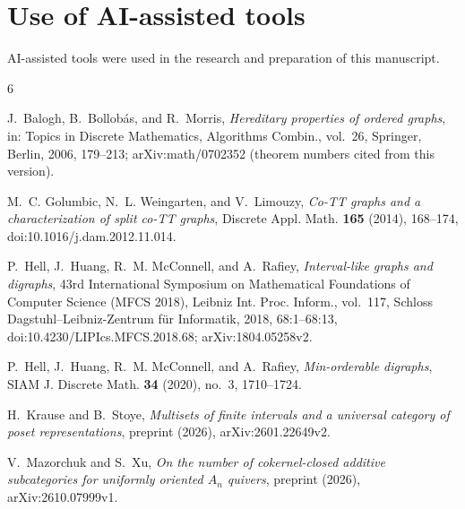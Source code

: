 \documentclass[11pt]{amsart}
\theoremstyle{definition}
\theoremstyle{remark}
\numberwithin{equation}{section}
\begin{document}
\section*{Use of AI-assisted tools}

AI-assisted tools were used in the research and preparation of this manuscript.

\begin{thebibliography}{6}

J.~Balogh, B.~Bollob\'as, and R.~Morris, \emph{Hereditary properties of ordered graphs}, in: Topics in Discrete Mathematics, Algorithms Combin., vol.~26, Springer, Berlin, 2006, 179--213; arXiv:math/0702352 (theorem numbers cited from this version).

M.~C. Golumbic, N.~L. Weingarten, and V.~Limouzy, \emph{Co-TT graphs and a characterization of split co-TT graphs}, Discrete Appl. Math. \textbf{165} (2014), 168--174, doi:10.1016/j.dam.2012.11.014.

P.~Hell, J.~Huang, R.~M. McConnell, and A.~Rafiey, \emph{Interval-like graphs and digraphs}, 43rd International Symposium on Mathematical Foundations of Computer Science (MFCS 2018), Leibniz Int. Proc. Inform., vol.~117, Schloss Dagstuhl--Leibniz-Zentrum f\"ur Informatik, 2018, 68:1--68:13, doi:10.4230/LIPIcs.MFCS.2018.68; arXiv:1804.05258v2.

P.~Hell, J.~Huang, R.~M. McConnell, and A.~Rafiey, \emph{Min-orderable digraphs}, SIAM J. Discrete Math. \textbf{34} (2020), no.~3, 1710--1724.

H.~Krause and B.~Stoye, \emph{Multisets of finite intervals and a universal category of poset representations}, preprint (2026), arXiv:2601.22649v2.

V.~Mazorchuk and S.~Xu, \emph{On the number of cokernel-closed additive subcategories for uniformly oriented $A_n$ quivers}, preprint (2026), arXiv:2610.07999v1.

\end{thebibliography}
\end{document}
